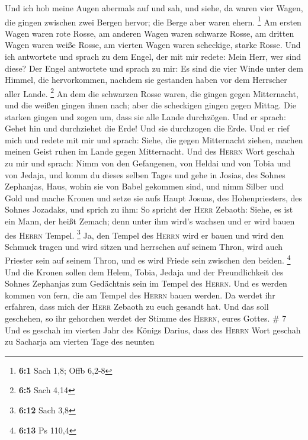  Und ich hob meine Augen abermals auf und sah, und siehe,
da waren vier Wagen, die gingen zwischen zwei Bergen hervor; die Berge
aber waren ehern. \footnote{\textbf{6:1} Sach 1,8; Offb 6,2-8}
 Am ersten Wagen waren rote Rosse, am anderen Wagen waren
schwarze Rosse,  am dritten Wagen waren weiße Rosse, am
vierten Wagen waren scheckige, starke Rosse.  Und ich
antwortete und sprach zu dem Engel, der mit mir redete: Mein Herr, wer
sind diese?  Der Engel antwortete und sprach zu mir: Es
sind die vier Winde unter dem Himmel, die hervorkommen, nachdem sie
gestanden haben vor dem Herrscher aller Lande. \footnote{\textbf{6:5}
  Sach 4,14}  An dem die schwarzen Rosse waren, die gingen
gegen Mitternacht, und die weißen gingen ihnen nach; aber die scheckigen
gingen gegen Mittag.  Die starken gingen und zogen um,
dass sie alle Lande durchzögen. Und er sprach: Gehet hin und durchziehet
die Erde! Und sie durchzogen die Erde.  Und er rief mich
und redete mit mir und sprach: Siehe, die gegen Mitternacht ziehen,
machen meinen Geist ruhen im Lande gegen Mitternacht.  Und
des \textsc{Herrn} Wort geschah zu mir und sprach:  Nimm
von den Gefangenen, von Heldai und von Tobia und von Jedaja, und komm du
dieses selben Tages und gehe in Josias, des Sohnes Zephanjas, Haus,
wohin sie von Babel gekommen sind,  und nimm Silber und
Gold und mache Kronen und setze sie aufs Haupt Josuas, des
Hohenpriesters, des Sohnes Jozadaks,  und sprich zu ihm:
So spricht der \textsc{Herr} Zebaoth: Siehe, es ist ein Mann, der heißt
Zemach; denn unter ihm wird's wachsen und er wird bauen des
\textsc{Herrn} Tempel. \footnote{\textbf{6:12} Sach 3,8} 
Ja, den Tempel des \textsc{Herrn} wird er bauen und wird den Schmuck
tragen und wird sitzen und herrschen auf seinem Thron, wird auch
Priester sein auf seinem Thron, und es wird Friede sein zwischen den
beiden. \footnote{\textbf{6:13} Ps 110,4}  Und die Kronen
sollen dem Helem, Tobia, Jedaja und der Freundlichkeit des Sohnes
Zephanjas zum Gedächtnis sein im Tempel des \textsc{Herrn}.
 Und es werden kommen von fern, die am Tempel des
\textsc{Herrn} bauen werden. Da werdet ihr erfahren, dass mich der
\textsc{Herr} Zebaoth zu euch gesandt hat. Und das soll geschehen, so
ihr gehorchen werdet der Stimme des \textsc{Herrn}, eures Gottes. \# 7
 Und es geschah im vierten Jahr des Königs Darius, dass
des \textsc{Herrn} Wort geschah zu Sacharja am vierten Tage des neunten
